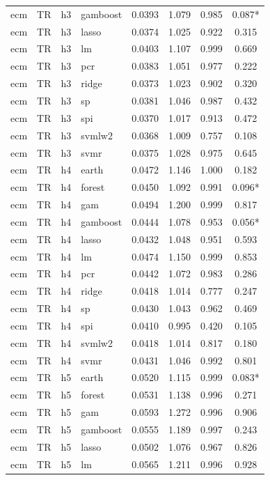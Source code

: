 \begin{ThreePartTable}
\begin{longtable}[t]{llclcccc}
ecm & TR & h3 & gamboost & 0.0393 & 1.079 & 0.985 & 0.087*\\
ecm & TR & h3 & lasso & 0.0374 & 1.025 & 0.922 & 0.315\\
ecm & TR & h3 & lm & 0.0403 & 1.107 & 0.999 & 0.669\\
ecm & TR & h3 & pcr & 0.0383 & 1.051 & 0.977 & 0.222\\
ecm & TR & h3 & ridge & 0.0373 & 1.023 & 0.902 & 0.320\\
ecm & TR & h3 & sp & 0.0381 & 1.046 & 0.987 & 0.432\\
ecm & TR & h3 & spi & 0.0370 & 1.017 & 0.913 & 0.472\\
ecm & TR & h3 & svmlw2 & 0.0368 & 1.009 & 0.757 & 0.108\\
ecm & TR & h3 & svmr & 0.0375 & 1.028 & 0.975 & 0.645\\
\addlinespace
ecm & TR & h4 & earth & 0.0472 & 1.146 & 1.000 & 0.182\\
ecm & TR & h4 & forest & 0.0450 & 1.092 & 0.991 & 0.096*\\
ecm & TR & h4 & gam & 0.0494 & 1.200 & 0.999 & 0.817\\
ecm & TR & h4 & gamboost & 0.0444 & 1.078 & 0.953 & 0.056*\\
ecm & TR & h4 & lasso & 0.0432 & 1.048 & 0.951 & 0.593\\
ecm & TR & h4 & lm & 0.0474 & 1.150 & 0.999 & 0.853\\
ecm & TR & h4 & pcr & 0.0442 & 1.072 & 0.983 & 0.286\\
ecm & TR & h4 & ridge & 0.0418 & 1.014 & 0.777 & 0.247\\
ecm & TR & h4 & sp & 0.0430 & 1.043 & 0.962 & 0.469\\
ecm & TR & h4 & spi & 0.0410 & 0.995 & 0.420 & 0.105\\
ecm & TR & h4 & svmlw2 & 0.0418 & 1.014 & 0.817 & 0.180\\
ecm & TR & h4 & svmr & 0.0431 & 1.046 & 0.992 & 0.801\\
\addlinespace
ecm & TR & h5 & earth & 0.0520 & 1.115 & 0.999 & 0.083*\\
ecm & TR & h5 & forest & 0.0531 & 1.138 & 0.996 & 0.271\\
ecm & TR & h5 & gam & 0.0593 & 1.272 & 0.996 & 0.906\\
ecm & TR & h5 & gamboost & 0.0555 & 1.189 & 0.997 & 0.243\\
ecm & TR & h5 & lasso & 0.0502 & 1.076 & 0.967 & 0.826\\
ecm & TR & h5 & lm & 0.0565 & 1.211 & 0.996 & 0.928\\

\end{longtable}
\end{ThreePartTable}
